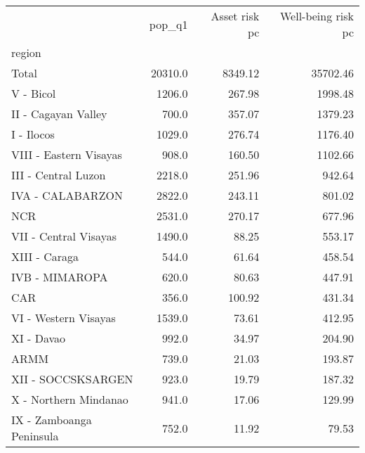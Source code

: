 \begin{tabular}{lrrr}
\toprule
{} &   pop\_q1 &  Asset risk pc &  Well-being risk pc \\
region                   &          &                &                     \\
\midrule
Total                    &  20310.0 &        8349.12 &            35702.46 \\
V - Bicol                &   1206.0 &         267.98 &             1998.48 \\
II - Cagayan Valley      &    700.0 &         357.07 &             1379.23 \\
I - Ilocos               &   1029.0 &         276.74 &             1176.40 \\
VIII - Eastern Visayas   &    908.0 &         160.50 &             1102.66 \\
III - Central Luzon      &   2218.0 &         251.96 &              942.64 \\
IVA - CALABARZON         &   2822.0 &         243.11 &              801.02 \\
NCR                      &   2531.0 &         270.17 &              677.96 \\
VII - Central Visayas    &   1490.0 &          88.25 &              553.17 \\
XIII - Caraga            &    544.0 &          61.64 &              458.54 \\
IVB - MIMAROPA           &    620.0 &          80.63 &              447.91 \\
CAR                      &    356.0 &         100.92 &              431.34 \\
VI - Western Visayas     &   1539.0 &          73.61 &              412.95 \\
XI - Davao               &    992.0 &          34.97 &              204.90 \\
ARMM                     &    739.0 &          21.03 &              193.87 \\
XII - SOCCSKSARGEN       &    923.0 &          19.79 &              187.32 \\
X - Northern Mindanao    &    941.0 &          17.06 &              129.99 \\
IX - Zamboanga Peninsula &    752.0 &          11.92 &               79.53 \\
\bottomrule
\end{tabular}
